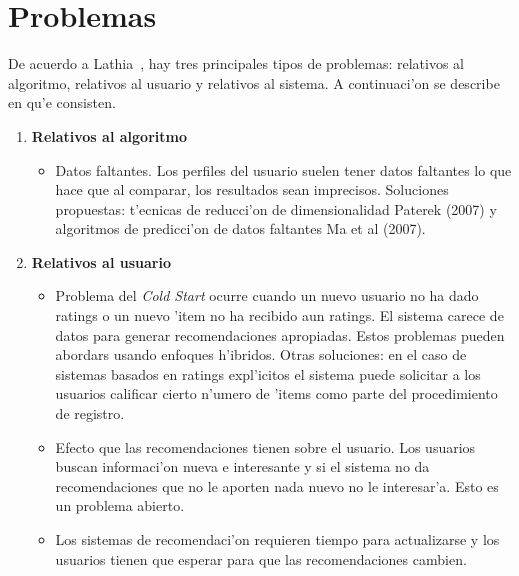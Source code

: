 \documentclass[11pt]{article}
\begin{document}


\section{Problemas}
De acuerdo a Lathia~\cite{recsys:nlathia}, hay tres principales tipos de problemas: relativos al algoritmo, relativos al usuario y relativos al sistema. A continuaci'on se describe en qu'e consisten.

\begin{enumerate}
\item \textbf{Relativos al algoritmo}

\begin{itemize}
\item Datos faltantes. Los perfiles del usuario suelen tener datos faltantes lo que hace que al comparar, los resultados sean imprecisos. Soluciones propuestas: t'ecnicas de reducci'on de dimensionalidad Paterek (2007) y algoritmos de predicci'on de datos faltantes Ma et al (2007).
\end{itemize}

\item \textbf{Relativos al usuario}
\begin{itemize}
\item Problema del \textit{Cold Start} ocurre cuando un nuevo usuario no ha dado ratings o un nuevo 'item no ha recibido aun ratings. El sistema carece de datos para generar recomendaciones apropiadas. Estos problemas pueden abordars usando enfoques h'ibridos. Otras soluciones: en el caso de sistemas basados en ratings expl'icitos el sistema puede solicitar a los usuarios calificar cierto n'umero de 'items como parte del procedimiento de registro.
\item Efecto que las recomendaciones tienen sobre el usuario. Los usuarios buscan informaci'on nueva e interesante y si el sistema no da recomendaciones que no le aporten nada nuevo no le interesar'a. Esto es un problema abierto.
\item Los sistemas de recomendaci'on requieren tiempo para actualizarse y los usuarios tienen que esperar para que las recomendaciones cambien.
\end{itemize}


\end{enumerate}
\end{document}
